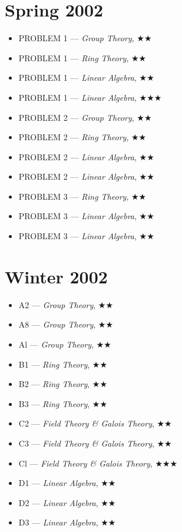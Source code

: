 \documentclass[11pt,letterpaper]{book}
\begin{document}
\section*{Spring 2002}
\begin{itemize}
\item PROBLEM 1 --- \textit{Group Theory}, $\bigstar\bigstar$
\item PROBLEM 1 --- \textit{Ring Theory}, $\bigstar\bigstar$
\item PROBLEM 1 --- \textit{Linear Algebra}, $\bigstar\bigstar$
\item PROBLEM 1 --- \textit{Linear Algebra}, $\bigstar\bigstar\bigstar$
\item PROBLEM 2 --- \textit{Group Theory}, $\bigstar\bigstar$
\item PROBLEM 2 --- \textit{Ring Theory}, $\bigstar\bigstar$
\item PROBLEM 2 --- \textit{Linear Algebra}, $\bigstar\bigstar$
\item PROBLEM 2 --- \textit{Linear Algebra}, $\bigstar\bigstar$
\item PROBLEM 3 --- \textit{Ring Theory}, $\bigstar\bigstar$
\item PROBLEM 3 --- \textit{Linear Algebra}, $\bigstar\bigstar$
\item PROBLEM 3 --- \textit{Linear Algebra}, $\bigstar\bigstar$
\end{itemize}

\section*{Winter 2002}
\begin{itemize}
\item A2 --- \textit{Group Theory}, $\bigstar\bigstar$
\item A8 --- \textit{Group Theory}, $\bigstar\bigstar$
\item Al --- \textit{Group Theory}, $\bigstar\bigstar$
\item B1 --- \textit{Ring Theory}, $\bigstar\bigstar$
\item B2 --- \textit{Ring Theory}, $\bigstar\bigstar$
\item B3 --- \textit{Ring Theory}, $\bigstar\bigstar$
\item C2 --- \textit{Field Theory \& Galois Theory}, $\bigstar\bigstar$
\item C3 --- \textit{Field Theory \& Galois Theory}, $\bigstar\bigstar$
\item Cl --- \textit{Field Theory \& Galois Theory}, $\bigstar\bigstar\bigstar$
\item D1 --- \textit{Linear Algebra}, $\bigstar\bigstar$
\item D2 --- \textit{Linear Algebra}, $\bigstar\bigstar$
\item D3 --- \textit{Linear Algebra}, $\bigstar\bigstar$
\end{itemize}
\end{document}
